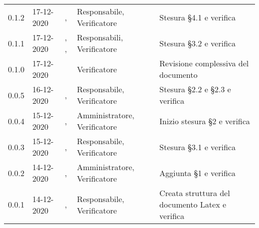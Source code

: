{{\begin{longtable}{C{1.7cm} | C{2.2cm} | C{3.2cm} | C{3cm} | C{4.8cm}}
0.1.2 & 17-12-2020 & \SG{}, \ZM{} & Responsabile, Verificatore & Stesura \S 4.1 e verifica\\

0.1.1 & 17-12-2020 & \SG{}, \BM{}, \SH{} & Responsabili, Verificatore & Stesura \S 3.2 e verifica \\

0.1.0 & 17-12-2020 & \ZM{} & Verificatore & Revisione complessiva del documento \\

0.0.5 & 16-12-2020 & \BM{}, \SH{} & Responsabile, Verificatore & Stesura \S 2.2 e \S 2.3 e verifica \\
		
0.0.4 & 15-12-2020 & \PA{}, \SH{} & Amministratore, Verificatore & Inizio stesura \S 2 e verifica \\

0.0.3 & 15-12-2020 & \SG{}, \ZM{} & Responsabile, Verificatore & Stesura \S 3.1 e verifica \\

0.0.2 & 14-12-2020 & \PA{}, \ZM{} & Amministratore, Verificatore & Aggiunta \S 1 e verifica \\

0.0.1 & 14-12-2020 & \SG{}, \ZM{} & Responsabile, Verificatore & Creata struttura del documento Latex e verifica \\
		
\end{longtable}
}
}
